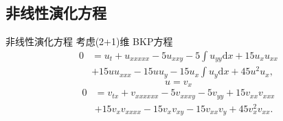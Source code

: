 \documentclass{beamer}
\newcommand{\dd}[1]{\mathrm{d}#1}
\begin{document}
\subsection{非线性演化方程}
\begin{frame}{非线性演化方程}
考虑(2+1)维 BKP方程
\begin{equation}
\begin{aligned}
0&=u_t+u_{xxxxx}-5u_{xxy}-5\int{u_{yy}\dd{x}}+15u_xu_{xx}\\
&+15uu_{xxx}-15uu_y-15u_x\int{u_y\dd{x}}+45u^2u_x, \label{BKP}
\end{aligned}
\end{equation}
\pause 
\begin{equation}
  u=v_x
\end{equation}
\pause 
\begin{equation}
\begin{aligned}
0&=v_{tx}+v_{xxxxxx}-5v_{xxxy}-5v_{yy}+15v_{xx}v_{xxx}\\
&+15v_xv_{xxxx}-15v_xv_{xy}-15v_{xx}v_y+45v_x^2v_{xx}. 
\end{aligned}
\end{equation}
\end{frame}
\end{document}
